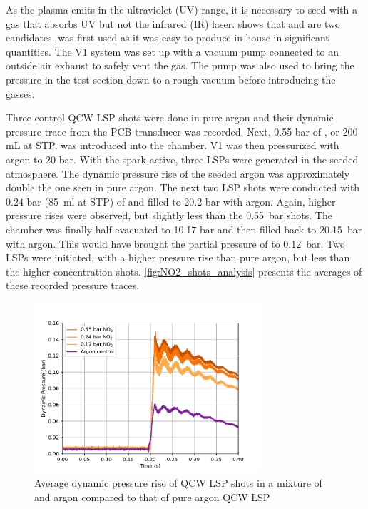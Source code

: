             As the plasma emits in the ultraviolet (UV) range, it is necessary to seed with a gas that absorbs UV but not the infrared (IR) laser. \textcite{khanGasDetectionUsing2019} shows that  and  are two candidates.  was first used as it was easy to produce in-house in significant quantities. The V1 system was set up with a vacuum pump connected to an outside air exhaust to safely vent the  gas. The pump was also used to bring the pressure in the test section down to a rough vacuum before introducing the gasses.


            Three control QCW LSP shots were done in pure argon and their dynamic pressure trace from the PCB transducer was recorded. Next, 0.55 bar of , or 200 mL at STP, was introduced into the chamber. V1 was then pressurized with argon to 20 bar. With the spark active, three LSPs were generated in the seeded atmosphere. The dynamic pressure rise of the seeded argon was approximately double the one seen in pure argon. The next two LSP shots were conducted with 0.24 bar (\qty{85}{ml} at STP) of  and filled to 20.2 bar with argon. Again, higher pressure rises were observed, but slightly less than the \qty{0.55}{bar} shots. The chamber was finally half evacuated to 10.17 bar and then filled back to \qty{20.15}{bar} with argon. This would have brought the partial pressure of  to \qty{0.12}{bar}. Two LSPs were initiated, with a higher pressure rise than pure argon, but less than the higher concentration  shots. \autoref{fig:NO2_shots_analysis} presents the averages of these recorded pressure traces.

            \begin{figure}[!ht]
                \centering
                \includegraphics[width=0.75\textwidth]{assets/4 experiments/NO2_shots_analysis.pdf}
                \caption{Average dynamic pressure rise of QCW LSP shots in a mixture of  and argon compared to that of pure argon QCW LSP}
                \label{fig:NO2_shots_analysis}
            \end{figure}

